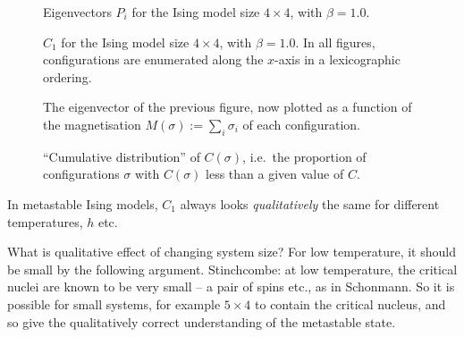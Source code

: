 \documentclass[10pt]{article}
\newcommand{\scalefig}[2]{\texttt{[image: \#2]}}
\newcommand{\defeq}{:=}
\newcommand{\zeros}{\mathbf{0}}
\begin{document}
 \begin{figure}[htb]
\caption{Eigenvectors $P_i$ for the Ising model size $4 \times 4$, with  $\beta=1.0$.}
\label{fig:ising-P}
\end{figure}

\begin{figure}[htb]
\caption{$C_1$ for the Ising model size $4 \times 4$, with  $\beta=1.0$.
In all figures, configurations are enumerated along the $x$-axis in a
lexicographic ordering.
}
\label{fig:ising-C}
\end{figure}



% 
% 
\begin{figure}[htb]
\caption{ The eigenvector of the previous figure, now plotted as a
function of the magnetisation
$M(\sigma) \defeq \sum_i \sigma_i$ of each configuration. 
}
\label{fig:ising-C1-fn-magn}
\end{figure}

\begin{figure}[htb]
\caption{``Cumulative distribution'' of $C(\sigma)$, i.e.\ the
proportion
of configurations $\sigma$ with $C(\sigma)$ less than a given value of $C$.}
\label{fig:ising-sorted}
\end{figure}

In metastable Ising models, $C_1$ always looks \emph{qualitatively} the same for
different temperatures, $h$ etc.

What is qualitative effect of changing system
size?  For low temperature, it should be small by the following argument.
Stinchcombe: at low temperature, the critical nuclei are known to be very
small --  a pair of spins etc., as in Schonmann.  So it is
possible for
small systems, for example $5\times4$
to contain the critical nucleus, and so give the qualitatively correct
understanding of the metastable state.
\end{document}
